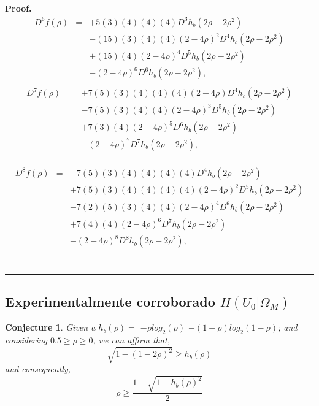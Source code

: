 \documentclass[a4paper,10pt]{article}
\newtheorem{conjecture}[mytheorem]{Conjecture}
\newenvironment{myproof}[1][Proof]{\textbf{#1.} }{\ \rule{0.5em}{0.5em}}
\begin{document}
\begin{myproof}
\begin{equation}
\begin{matrix}
D^6 f(\rho) &=& +5(3)(4)(4)(4) D^3 h_{b}(2\rho-2\rho^2) \\
           ~&~& -(15)(3)(4)(4)(2-4\rho)^2 D^4 h_{b}(2\rho-2\rho^2) \\
           ~&~& +(15)(4)(2-4\rho)^4 D^5 h_{b}(2\rho-2\rho^2) \\
           ~&~& -(2-4\rho)^6 D^6 h_{b}(2\rho-2\rho^2),\\
\end{matrix}
\end{equation}
\begin{equation}\label{eq:ProofDnh0Omega2_7}
\begin{matrix}
D^7 f(\rho) &=& +7(5)(3)(4)(4)(4)(2-4\rho) D^4 h_{b}(2\rho-2\rho^2) \\
           ~&~& -7(5)(3)(4)(4)(2-4\rho)^3 D^5 h_{b}(2\rho-2\rho^2) \\
           ~&~& +7(3)(4)(2-4\rho)^5 D^6 h_{b}(2\rho-2\rho^2) \\
           ~&~& -(2-4\rho)^7 D^7 h_{b}(2\rho-2\rho^2),\\
\end{matrix}
\end{equation}

\begin{equation}\label{eq:ProofDnh0Omega2_8}
\begin{matrix}
D^8 f(\rho) &=& -7(5)(3)(4)(4)(4)(4) D^4 h_{b}(2\rho-2\rho^2) \\
           ~&~& +7(5)(3)(4)(4)(4)(4)(2-4\rho)^2 D^5 h_{b}(2\rho-2\rho^2) \\
           ~&~& -7(2)(5)(3)(4)(4)(2-4\rho)^4 D^6 h_{b}(2\rho-2\rho^2) \\
           ~&~& +7(4)(4)(2-4\rho)^6 D^7 h_{b}(2\rho-2\rho^2)\\
           ~&~& -(2-4\rho)^8 D^8 h_{b}(2\rho-2\rho^2),\\
\end{matrix}
\end{equation}
\end{myproof}


\subsection{Experimentalmente corroborado $H(U_0|\Omega_M)$ }
\label{subsec:h0OmegaM_C2}
\begin{mdframed}[style=MDFStyGrayScreen]
\begin{conjecture}
 \label{lemm:hbapprox1}
Given a $h_{b}(\rho) =$ $-\rho log_2(\rho)$ $-(1-\rho) log_2(1-\rho)$;
and considering $0.5\geq \rho \geq 0$, we can affirm that,
\begin{equation}\label{eq:hbapprox1_1}
\sqrt{1-(1-2\rho)^2}\geq h_{b}(\rho)
\end{equation}
and consequently,
\begin{equation}\label{eq:hbapprox1_2}
\rho \geq  \frac{1-\sqrt{1-h_{b}(\rho)^2}}{2}
\end{equation}
\end{conjecture}
\end{mdframed}
\end{document}
